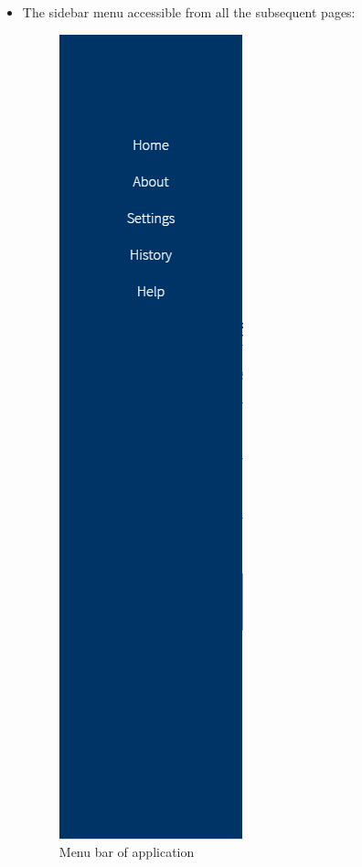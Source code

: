 \documentclass[10pt,twocolumn]{witseiepaper}
\begin{document}
		\begin{itemize}
			\item The sidebar menu accessible from all the subsequent pages:
			\begin{figure}[h!]
				\centering
				\includegraphics[scale = 0.3]{../images/menu.PNG}
				\caption{Menu bar of application}
				\label{menu}
			\end{figure}
			

\end{itemize}
\end{document}
